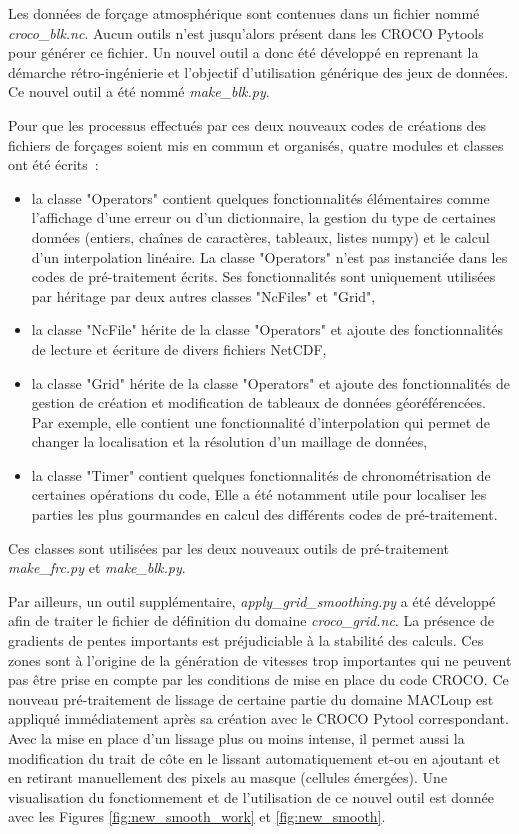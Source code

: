\documentclass[10pt,a4paper,titlepage]{article}
\begin{document}
Les données de forçage atmosphérique sont contenues dans un fichier nommé \textit{croco\_blk.nc}.
Aucun outils n'est jusqu'alors présent dans les CROCO Pytools pour générer ce fichier.
Un nouvel outil a donc été développé en reprenant la démarche rétro-ingénierie et l'objectif d'utilisation générique des jeux de données.
Ce nouvel outil a été nommé \textit{make\_blk.py}.

Pour que les processus effectués par ces deux nouveaux codes de créations des fichiers de forçages soient mis en commun et organisés, quatre modules et classes ont été écrits~:
\begin{itemize}
    \item la classe "Operators" contient quelques fonctionnalités élémentaires comme l'affichage d'une erreur ou d'un dictionnaire, la gestion du type de certaines données (entiers, chaînes de caractères, tableaux, listes numpy) et le calcul d'un interpolation linéaire.
    La classe "Operators" n'est pas instanciée dans les codes de pré-traitement écrits.
    Ses fonctionnalités sont uniquement  utilisées par héritage par deux autres classes "NcFiles" et "Grid",
    \item la classe "NcFile" hérite de la classe "Operators" et ajoute des fonctionnalités de lecture et écriture de divers fichiers NetCDF,
    \item la classe "Grid" hérite de la classe "Operators" et ajoute des fonctionnalités de gestion de création et modification de tableaux de données géoréférencées.
    Par exemple, elle contient une fonctionnalité d'interpolation qui permet de changer la localisation et la résolution d'un maillage de données,
    \item la classe "Timer" contient quelques fonctionnalités de chronométrisation de certaines opérations du code,
    Elle a été notamment utile pour localiser les parties les plus gourmandes en calcul des différents codes de pré-traitement.
\end{itemize}
Ces classes sont utilisées par les deux nouveaux outils de pré-traitement \textit{make\_frc.py} et \textit{make\_blk.py}.

Par ailleurs, un outil supplémentaire, \textit{apply\_grid\_smoothing.py} a été développé afin de traiter le fichier de définition du domaine \textit{croco\_grid.nc}.
La présence de gradients de pentes importants est préjudiciable à la stabilité des calculs. Ces zones sont à l'origine de la génération de vitesses trop importantes qui ne peuvent pas être prise en compte par les conditions de mise en place du code CROCO.
Ce nouveau pré-traitement de lissage de certaine partie du domaine MACLoup est appliqué immédiatement après sa création avec le CROCO Pytool correspondant.
Avec la mise en place d'un lissage plus ou moins intense, il permet aussi la modification du trait de côte en le lissant automatiquement et-ou en ajoutant et en retirant manuellement des pixels au masque (cellules émergées).
Une visualisation du fonctionnement et de l'utilisation de ce nouvel outil est donnée avec les Figures \ref{fig:new_smooth_work} et \ref{fig:new_smooth}.
\end{document}
